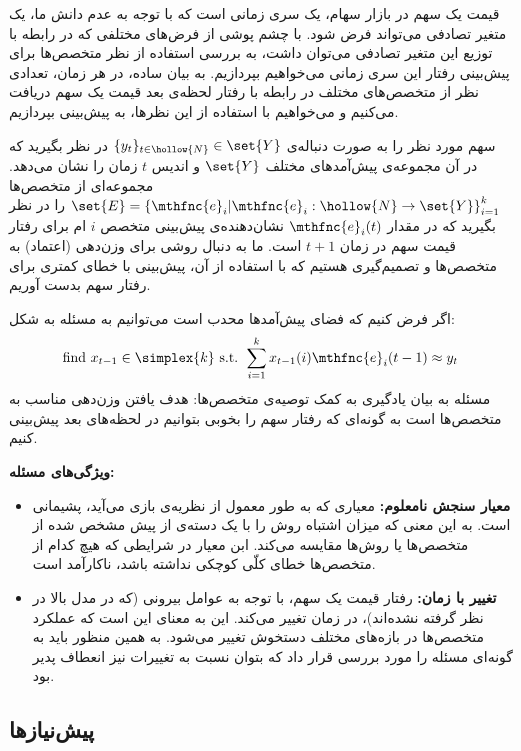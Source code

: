 \documentclass[a4paper,11px]{article}
\begin{document}
قیمت یک سهم در بازار سهام، یک سری زمانی است که با توجه به عدم دانش ما، یک متغیر تصادفی می‌تواند فرض شود. با چشم پوشی از فرض‌های مختلفی که در رابطه با توزیع این متغیر تصادفی می‌توان داشت، به بررسی استفاده از نظر متخصص‌ها برای پیش‌بینی رفتار این سری زمانی می‌خواهیم بپردازیم. به بیان ساده، در هر زمان، تعدادی نظر از متخصص‌های مختلف در رابطه با رفتار لحظه‌ی بعد قیمت یک سهم دریافت می‌کنیم و می‌خواهیم با استفاده از این نظرها، به پیش‌بینی بپردازیم.

سهم مورد نظر را به صورت دنباله‌ی
$\{ y_t \}_{t \in \hollow{N}} \in \set{Y}$
در نظر بگیرید که در آن مجموعه‌ی پیش‌آمدهای مختلف
$\set{Y}$
و اندیس
$t$
زمان را نشان می‌دهد. مجموعه‌ای از متخصص‌ها
$\set{E} = \left\lbrace \mthfnc{e}_i \vert \mthfnc{e}_i: \hollow{N} \rightarrow \set{Y} \right\rbrace^{k}_{i=1}$
را در نظر بگیرید که در مقدار
$\mthfnc{e}_i(t)$
نشان‌دهنده‌ی پیش‌بینی متخصص
$i$
ام برای رفتار قیمت سهم در زمان
$t+1$
است. ما به دنبال روشی برای وزن‌دهی (اعتماد) به متخصص‌ها و تصمیم‌گیری هستیم که با استفاده از آن، پیش‌بینی با خطای کمتری برای رفتار سهم بدست آوریم.

اگر فرض کنیم که فضای پیش‌آمدها محدب است می‌توانیم به مسئله به شکل:
\[
\mbox{find } x_{t-1} \in \simplex{k} \mbox{ s.t. } \sum^{k}_{i=1} x_{t-1}(i) \mthfnc{e}_i(t-1) \approx y_t
\]
مسئله به بیان یادگیری به کمک توصیه‌ی متخصص‌ها: هدف یافتن وزن‌دهی مناسب به متخصص‌ها است به گونه‌ای که رفتار سهم را بخوبی بتوانیم در لحظه‌های بعد پیش‌بینی کنیم.

\textbf{
ویژگی‌های مسئله:
}
\begin{itemize}
\item\textbf{
معیار سنجش نامعلوم:
}
معیاری که به طور معمول از نظریه‌ی بازی
می‌آید، پشیمانی
است. به این معنی که میزان اشتباه روش را با یک دسته‌ی از پیش مشخص شده از متخصص‌ها یا روش‌ها مقایسه می‌کند. ابن معیار در شرایطی که هیچ کدام از متخصص‌ها خطای کلّی کوچکی نداشته باشد، ناکارآمد است.
\item\textbf{
تغییر با زمان:
}
رفتار قیمت یک سهم، با توجه به عوامل بیرونی (که در مدل بالا در نظر گرفته نشده‌اند)، در زمان تغییر می‌کند. این به معنای این است که عملکرد متخصص‌ها در بازه‌های مختلف دستخوش تغییر می‌شود. به همین منظور باید به گونه‌ای مسئله را مورد بررسی قرار داد که بتوان نسبت به تغییرات نیز انعطاف پدیر بود.
\end{itemize}




\subsection{
پیش‌نیازها
}
\end{document}
